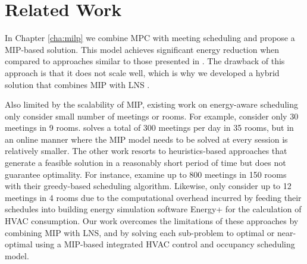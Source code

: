 \section{Related Work}\label{sec:related_work}

In Chapter \ref{cha:milp} we combine MPC with meeting scheduling and propose a MIP-based solution. This model achieves significant energy reduction when compared to approaches similar to those presented in \cite{goyal2013occupancy,kwak2013tesla,majumdar2012energy}. The drawback of this approach is that it does not scale well, which is why we developed a hybrid solution that combines MIP with LNS \citep{lim2015large}. %

Also limited by the scalability of MIP, existing work on energy-aware scheduling only consider small number of meetings or rooms. For example, \cite{chai2014minimizing} consider only 30 meetings in 9 rooms. \cite{kwak2013tesla} solves a total of 300 meetings per day in 35 rooms, but in an online manner where the MIP model needs to be solved at every session is relatively smaller. The other work resorts to heuristics-based approaches that generate a feasible solution in a reasonably short period of time but does not guarantee optimality. For instance, \cite{pan2013minimizing} examine up to 800 meetings in 150 rooms with their greedy-based scheduling algorithm. Likewise, \cite{majumdar2016characterising} only consider up to 12 meetings in 4 rooms due to the computational overhead incurred by feeding their schedules into building energy simulation software Energy+ \citep{crawley2000energyplus} for the calculation of HVAC consumption. Our work overcomes the limitations of these approaches by combining MIP with LNS, and by solving each sub-problem to optimal or near-optimal using a MIP-based integrated HVAC control and occupancy scheduling model. %

